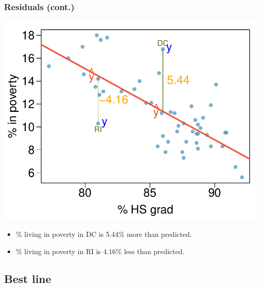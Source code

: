 \begin{frame}
\frametitle{Residuals (cont.)}

\vspace{-0.5cm}
{
\begin{center}
\includegraphics[width=\textwidth]{7-2_least_square_reg/figures/poverty/poverty_hsgrad_res_text}
\end{center}
}
{
\pause
\begin{itemize}
\item \% living in poverty in DC is 5.44\% more than predicted.
\pause
\item \% living in poverty in RI is 4.16\% less than predicted.
\end{itemize}
}


\end{frame}


\subsection{Best line}


